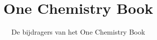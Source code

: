 \documentclass[11pt,a4paper,twoside,openany]{book}
\title{One Chemistry Book}
\author{De bijdragers van het One Chemistry Book}
\date{\bookdate}
\begin{document}
\frontmatter




\tableofcontents

\mainmatter



\appendix
\part{\omsolutionspart}


\backmatter
\renewcommand{\indexspace}{\par\vskip 8pt plus 4pt minus 4pt\relax}
\printindex
\end{document}
